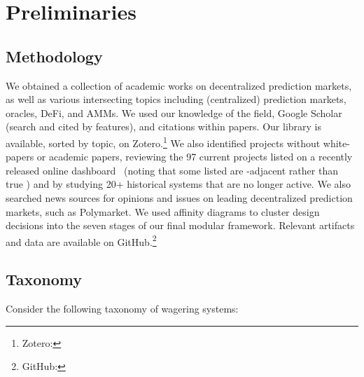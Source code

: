 \section{Preliminaries}

\subsection{Methodology}

We obtained a collection of academic works on decentralized prediction markets, as well as various intersecting topics including (centralized) prediction markets, oracles, DeFi, and AMMs. We used our knowledge of the field, Google Scholar (search and cited by features), and citations within papers. Our library is available, sorted by topic, on Zotero.\footnote{Zotero: } We also identified projects without white-papers or academic papers, reviewing the 97 current projects listed on a recently released online dashboard~\cite{Sal25} (noting that some listed are \depm-adjacent rather than true \depms) and by studying 20+ historical systems that are no longer active. We also searched news sources for opinions and issues on leading decentralized prediction markets, such as Polymarket. We used affinity diagrams to cluster design decisions into the seven stages of our final modular framework. Relevant artifacts and data are available on GitHub.\footnote{GitHub: }   


\subsection{Taxonomy}

Consider the following taxonomy of wagering systems:


